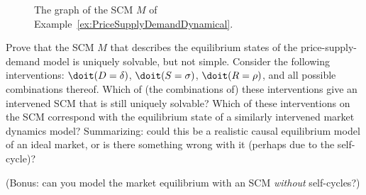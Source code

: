 \begin{Eg}
\begin{figure}

  \caption{The graph of the SCM $M$ of Example~\ref{ex:PriceSupplyDemandDynamical}.}
   \label{fig:PriceSupplyDemand}
\end{figure}

\end{Eg}

\begin{Exc}
  Prove that the SCM $M$ that describes the equilibrium states of the price-supply-demand model is uniquely solvable, but not simple. 
  Consider the following interventions: $\doit(D=\delta)$, $\doit(S=\sigma)$, $\doit(R=\rho)$, and all possible combinations thereof. Which of (the combinations of) these interventions give an intervened SCM that is still uniquely solvable?
  Which of these interventions on the SCM correspond with the equilibrium state of a similarly intervened market dynamics model?
  Summarizing: could this be a realistic causal equilibrium model of an ideal market, or is there something wrong with it (perhaps due to the self-cycle)?

  (Bonus: can you model the market equilibrium with an SCM \emph{without} self-cycles?)
\end{Exc}

